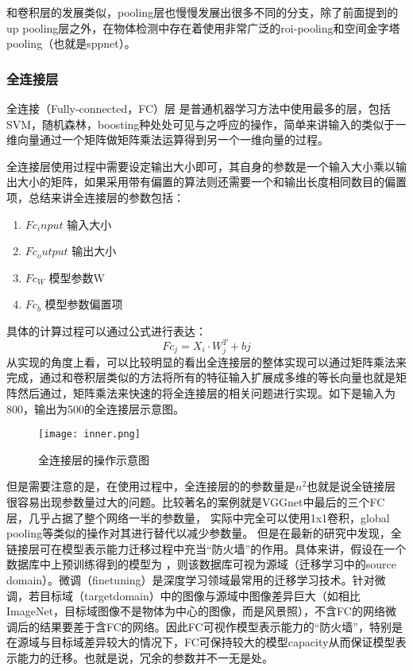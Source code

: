 和卷积层的发展类似，pooling层也慢慢发展出很多不同的分支，除了前面提到的 up pooling层之外，在物体检测中存在着使用非常广泛的roi-pooling\cite{ROIPOOLING}和空间金字塔pooling（也就是sppnet）\cite{SPPNET}。
\subsubsection{全连接层}
全连接（Fully-connected，FC）层
是普通机器学习方法中使用最多的层，包括SVM，随机森林，boosting种处处可见与之呼应的操作，简单来讲输入的类似于一维向量通过一个矩阵做矩阵乘法运算得到另一个一维向量的过程。

全连接层使用过程中需要设定输出大小即可，其自身的参数是一个输入大小乘以输出大小的矩阵，如果采用带有偏置的算法则还需要一个和输出长度相同数目的偏置项，总结来讲全连接层的参数包括：
\begin{enumerate}
\item $Fc_input$  输入大小
\item $Fc_output$ 输出大小
\item $Fc_W$ 		  模型参数W
\item $Fc_b$ 		  模型参数偏置项
\end{enumerate}

具体的计算过程可以通过公式进行表达：
\begin{equation}{
Fc_j=X_i·W_j^T+bj
}
\end{equation}
从实现的角度上看，可以比较明显的看出全连接层的整体实现可以通过矩阵乘法来完成，通过和卷积层类似的方法将所有的特征输入扩展成多维的等长向量也就是矩阵然后通过，矩阵乘法来快速的将全连接层的相关问题进行实现。如下是输入为800，输出为500的全连接层示意图。
\begin{figure}[!ht]
 \centering
	\texttt{[image: inner.png]}
	\caption{全连接层的操作示意图}
\end{figure}

但是需要注意的是，在使用过程中，全连接层的的参数量是$n^2$也就是说全链接层很容易出现参数量过大的问题。比较著名的案例就是VGGnet\cite{VGGNET}中最后的三个FC层，几乎占据了整个网络一半的参数量，
实际中完全可以使用1x1卷积\cite{1x1CONV}，global pooling\cite{1x1CONV}等类似的操作对其进行替代以减少参数量。
但是在最新的研究中发现，全链接层可在模型表示能力迁移过程中充当“防火墙”的作用。具体来讲，假设在一个数据库中上预训练得到的模型为 ，则该数据库可视为源域（迁移学习中的source domain）。微调（finetuning）是深度学习领域最常用的迁移学习技术。针对微调，若目标域（targetdomain）中的图像与源域中图像差异巨大（如相比ImageNet，目标域图像不是物体为中心的图像，而是风景照），不含FC的网络微调后的结果要差于含FC的网络。因此FC可视作模型表示能力的“防火墙”，特别是在源域与目标域差异较大的情况下，FC可保持较大的模型capacity从而保证模型表示能力的迁移。也就是说，冗余的参数并不一无是处\cite{FCGOOD}。
